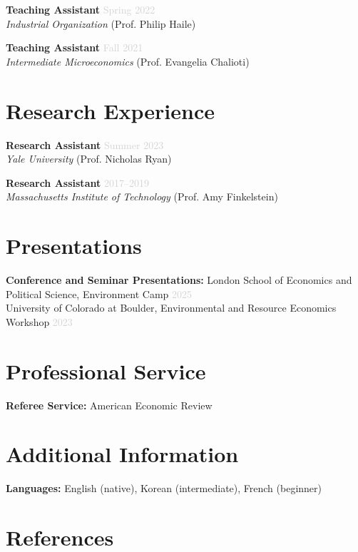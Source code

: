 \documentclass[11pt,letterpaper]{article}
\newcommand{\jobtitle}[1]{\textbf{\color{mediumgray}#1}}
\newcommand{\institution}[1]{\textit{#1}}
\newcommand{\daterange}[1]{\textcolor{lightgray}{#1}}
\begin{document}
\jobtitle{Teaching Assistant} \hfill \daterange{Spring 2022} \\
\institution{Industrial Organization} (Prof. Philip Haile)

\jobtitle{Teaching Assistant} \hfill \daterange{Fall 2021} \\
\institution{Intermediate Microeconomics} (Prof. Evangelia Chalioti)

\section*{Research Experience}

\jobtitle{Research Assistant} \hfill \daterange{Summer 2023} \\
\institution{Yale University} (Prof. Nicholas Ryan)

\jobtitle{Research Assistant} \hfill \daterange{2017--2019} \\
\institution{Massachusetts Institute of Technology} (Prof. Amy Finkelstein)

\section*{Presentations}

\textbf{Conference and Seminar Presentations:}
London School of Economics and Political Science, Environment Camp \hfill \daterange{2025} \\
University of Colorado at Boulder, Environmental and Resource Economics Workshop \hfill \daterange{2023}

\section*{Professional Service}

\textbf{Referee Service:} American Economic Review

\section*{Additional Information}

\textbf{Languages:} English (native), Korean (intermediate), French (beginner)

\newpage

\section*{References}
\end{document}
